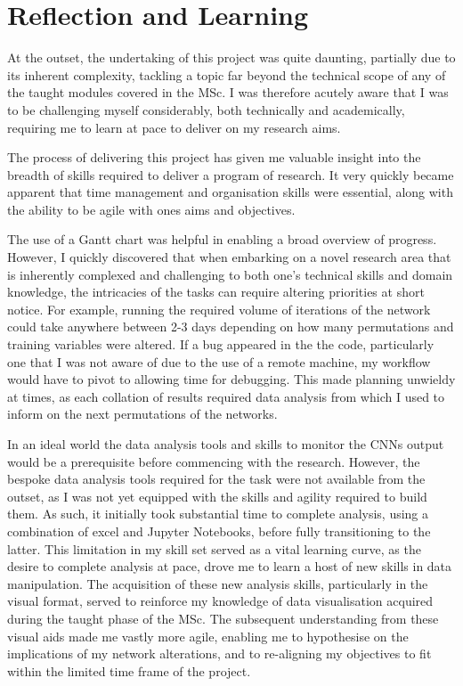 \chapter{Reflection and Learning}

At the outset, the undertaking of this project was quite daunting, partially due to its inherent complexity, tackling a topic far beyond the technical scope of any of the taught modules covered in the MSc. I was therefore acutely aware that I was to be challenging myself considerably, both technically and academically, requiring me to learn at pace to deliver on my research aims.

The process of delivering this project has given me valuable insight into the breadth of skills required to deliver a program of research. It very quickly became apparent that time management and organisation skills were essential, along with the ability to be agile with ones aims and objectives. 

The use of a Gantt chart was helpful in enabling a broad overview of progress. However, I quickly discovered that when embarking on a novel research area that is inherently complexed and challenging to both one’s technical skills and domain knowledge, the intricacies of the tasks can require altering priorities at short notice. For example, running the required volume of iterations of the network could take anywhere between 2-3 days depending on how many permutations and training variables were altered. If a bug appeared in the the code, particularly one that I was not aware of due to the use of a remote machine, my workflow would have to pivot to allowing time for debugging. This made planning unwieldy at times, as each collation of results required data analysis from which I used to inform on the next permutations of the networks. 

In an ideal world the data analysis tools and skills to monitor the CNNs output would be a prerequisite before commencing with the research. However, the bespoke data analysis tools required for the task were not available from the outset, as I was not yet equipped with the skills and agility required to build them. As such, it initially took substantial time to complete analysis, using a combination of excel and Jupyter Notebooks, before fully transitioning to the latter. This limitation in my skill set served as a vital learning curve, as the desire to complete analysis at pace, drove me to learn a host of new skills in data manipulation. The acquisition of these new analysis skills, particularly in the visual format, served to reinforce my knowledge of data visualisation acquired during the taught phase of the MSc. The subsequent understanding from these visual aids made me vastly more agile, enabling me to hypothesise on the implications of my network alterations, and to re-aligning my objectives to fit within the limited time frame of the project. 

